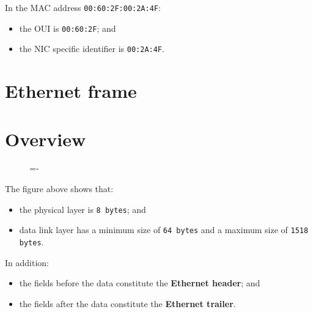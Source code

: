 \documentclass[a4paper]{systems-software}
\begin{document}
In the MAC address \texttt{00:60:2F:00:2A:4F}:
\begin{itemize}
	\item the OUI is \texttt{00:60:2F}; and
	\item the NIC specific identifier is \texttt{00:2A:4F}.
\end{itemize}


\newpage

\section{Ethernet frame}

\section*{Overview}

\begin{figure}[H]
	\lineskip=-\fboxrule
\end{figure}

The figure above shows that:
\begin{itemize}
	\item the physical layer is \texttt{8 bytes}; and
	\item data link layer has a minimum size of \texttt{64 bytes} and a maximum size of \texttt{1518 bytes}.
\end{itemize}

In addition:
\begin{itemize}
	\item the fields before the data constitute the \textbf{Ethernet header}; and
	\item the fields after the data constitute the \textbf{Ethernet trailer}.
\end{itemize}
\end{document}
